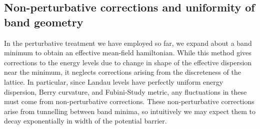 \documentclass[aps,prb,twocolumn,letterpaper,twoside,nobalancelastpage,groupedaddress,amsmath,amssymb,floatfix,citeautoscript]{revtex4-1}
\begin{document}
\subsection{Non-perturbative corrections and uniformity of band geometry}
In the perturbative treatment we have employed so far, we expand about a band minimum to obtain an effective mean-field hamiltonian. While this method gives corrections to the energy levels due to change in shape of the effective dispersion near the minimum, it neglects corrections arising from the discreteness of the lattice. In particular, since Landau levels have perfectly uniform energy dispersion, Berry curvature, and Fubini-Study metric, any fluctuations in these must come from non-perturbative corrections. These non-perturbative corrections arise from tunnelling between band minima, so intuitively we may expect them to decay exponentially in width of the potential barrier. 
\end{document}
